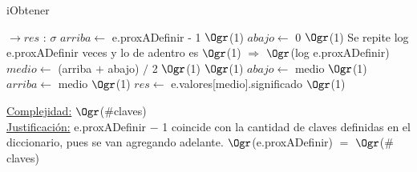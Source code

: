 \begin{Representacion}
	\begin{algorithm}[H]
		\caption{iObtener}
		\begin{algorithmic}
			 $\to res$ : $\sigma$
				\State $arriba \gets$ e.proxADefinir - 1 \Comment $\Ogr$(1)
				\State $abajo \gets$ 0 \Comment $\Ogr$(1)
				 \Comment Se repite log e.proxADefinir veces y lo de adentro es $\Ogr$(1) $\Rightarrow$ $\Ogr$(log e.proxADefinir)
					\State $	medio \gets$ (arriba $+$ abajo) $/$ 2 \Comment $\Ogr$(1)
					 \Comment $\Ogr$(1)
						\State $abajo \gets$ medio \Comment $\Ogr$(1)
					\Else
						\State $arriba \gets$ medio \Comment $\Ogr$(1)
					\EndIf
				\EndWhile
				\State $res \gets$ e.valores[medio].significado \Comment $\Ogr$(1)
			\EndProcedure
		\end{algorithmic}
		\underline{Complejidad:} $\Ogr$($\#$claves)\\
		\underline{Justificación:} e.proxADefinir $-$ 1 coincide con la cantidad de claves definidas en el diccionario, pues se van agregando adelante. $\Ogr$(e.proxADefinir) $=$ $\Ogr$($\#$claves)
	\end{algorithm}
	
\end{Representacion}